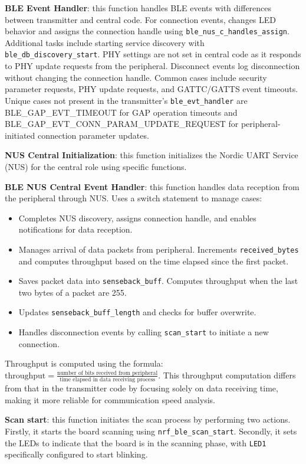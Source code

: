 \documentclass{Configuration_Files/PoliMi3i_thesis}
\begin{document}
\textbf{BLE Event Handler}: this function handles BLE events with differences between transmitter and central code. For connection events, changes LED behavior and assigns the connection handle using \texttt{ble\_nus\_c\_handles\_assign}. Additional tasks include starting service discovery with \texttt{ble\_db\_discovery\_start}. PHY settings are not set in central code as it responds to PHY update requests from the peripheral. Disconnect events log disconnection without changing the connection handle. Common cases include security parameter requests, PHY update requests, and GATTC/GATTS event timeouts. Unique cases not present in the transmitter's \texttt{ble\_evt\_handler} are BLE\_GAP\_EVT\_TIMEOUT for GAP operation timeouts and BLE\_GAP\_EVT\_CONN\_PARAM\_UPDATE\_REQUEST for peripheral-initiated connection parameter updates.

\textbf{NUS Central Initialization}: this function initializes the Nordic UART Service (NUS) for the central role using specific functions.

\textbf{BLE NUS Central Event Handler}: this function handles data reception from the peripheral through NUS. Uses a switch statement to manage cases:
\begin{itemize}
    \item Completes NUS discovery, assigns connection handle, and enables notifications for data reception.
    \item Manages arrival of data packets from peripheral. Increments \texttt{received\_bytes} and computes throughput based on the time elapsed since the first packet.
    \item Saves packet data into \texttt{senseback\_buff}. Computes throughput when the last two bytes of a packet are 255.
    \item Updates \texttt{senseback\_buff\_length} and checks for buffer overwrite.
    \item Handles disconnection events by calling \texttt{scan\_start} to initiate a new connection.
\end{itemize}
Throughput is computed using the formula: \(\text{throughput} = \frac{\text{number of bits received from peripheral}}{\text{time elapsed in data receiving process}}\). This throughput computation differs from that in the transmitter code by focusing solely on data receiving time, making it more reliable for communication speed analysis.



\textbf{Scan start}: this function initiates the scan process by performing two actions. Firstly, it starts the board scanning using \texttt{nrf\_ble\_scan\_start}. Secondly, it sets the LEDs to indicate that the board is in the scanning phase, with \texttt{LED1} specifically configured to start blinking.
\end{document}
